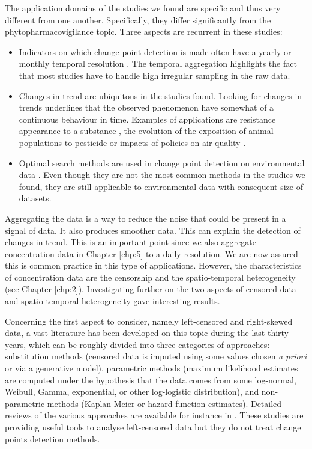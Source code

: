 The application domains of the studies we found are specific and thus very different from one another. Specifically, they differ significantly from the phytopharmacovigilance topic. Three aspects are recurrent in these studies: 
\begin{itemize}
\item Indicators on which change point detection is made often have a yearly or monthly temporal resolution \citep{Ko2017,Ryberg2020,FOMBY2006}. The temporal aggregation highlights the fact that most studies have to handle high irregular sampling in the raw data. 
\item Changes in trend are ubiquitous in the studies found. Looking for changes in trends underlines that the observed phenomenon have somewhat of a continuous behaviour in time. Examples of applications are resistance appearance to a substance \citep{Solla2010}, the evolution of the exposition of animal populations to pesticide \citep{Menger2022} or impacts of policies on air quality \citep{FOMBY2006}.
\item Optimal search methods are used in change point detection on environmental data \citep{BUNCE_2018,Ryberg2020}. Even though they are not the most common methods in the studies we found, they are still applicable to environmental data with consequent size of datasets. \end{itemize}

Aggregating the data is a way to reduce the noise that could be present in a signal of data. It also produces smoother data. This can explain the detection of changes in trend. This is an important point since we also aggregate concentration data in Chapter \ref{chp:5} to a daily resolution. We are now assured this is common practice in this type of applications. 
However, the characteristics of concentration data are the censorship and the spatio-temporal heterogeneity (see Chapter \ref{chp:2}).
Investigating further on the two aspects of censored data and spatio-temporal heterogeneity gave interesting results. 

Concerning the first aspect to consider, namely left-censored and right-skewed data, a vast literature has been developed on this topic during the last thirty years, which can be roughly divided into three categories of approaches: substitution methods (censored data is imputed using some values chosen \emph{a priori} or via a generative model), parametric methods (maximum likelihood estimates are computed under the hypothesis that the data comes from some log-normal, Weibull, Gamma, exponential, or other log-logistic distribution), and non-parametric methods (Kaplan-Meier or hazard function estimates). Detailed reviews of the various approaches are available  for instance in \cite{Authority2010,Hewett2007ACO,Mitra2008,Canales2018,Antweiler2008,Gillespie2010,shoari2018toward}. These studies are providing useful tools to analyse left-censored data but they do not treat change points detection methods. 

